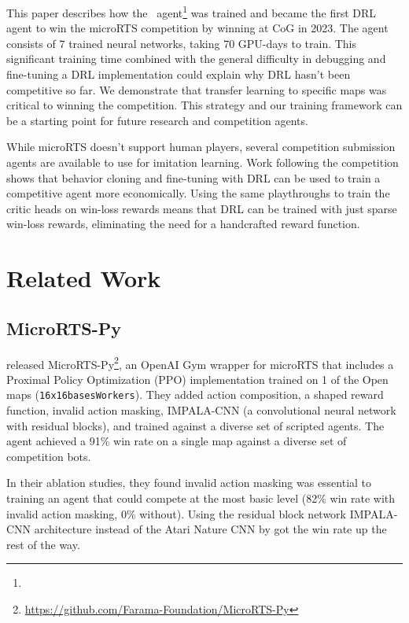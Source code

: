 \documentclass[conference]{IEEEtran}
\begin{document}
This paper describes how the \agentName\ agent\footnote{\raiMicroRTSGitHubUrl} was
trained and became the first DRL agent to win the microRTS competition by winning at CoG
in 2023. The agent consists of 7 trained neural networks, taking 70
GPU-days to train. This significant training time combined with the general difficulty
in debugging and fine-tuning a DRL implementation could explain why DRL hasn't been
competitive so far. We demonstrate that transfer learning to specific maps was
critical to winning the competition. This strategy and our training framework can be a starting
point for future research and competition agents.

While microRTS doesn't support human players, several competition submission agents are
available to use for imitation learning. Work following the
competition shows that behavior cloning and fine-tuning with DRL can be used to train a
competitive agent more economically. Using the same playthroughs to train the critic
heads on win-loss rewards means that DRL can be trained with just sparse win-loss
rewards, eliminating the need for a handcrafted reward function.

\section{Related Work}
\subsection{MicroRTS-Py}
\cite{DBLP:journals/corr/abs-2105-13807} released MicroRTS-Py\footnote{\url{https://github.com/Farama-Foundation/MicroRTS-Py}}, an OpenAI Gym
wrapper for microRTS that includes a Proximal Policy Optimization (PPO) \cite{DBLP:journals/corr/SchulmanWDRK17} implementation
trained on 1 of the Open maps (\texttt{16x16basesWorkers}). They added action composition, a shaped reward function, invalid action
masking, IMPALA-CNN (a convolutional neural network with residual blocks), and trained
against a diverse set of scripted agents. The agent achieved a
91\% win rate on a single map against a diverse set of competition bots.

In their ablation studies, they found invalid action masking was essential to training an agent that could compete at
the most basic level (82\% win rate with invalid action masking, 0\% without). Using the
residual block network IMPALA-CNN architecture instead of the Atari Nature CNN by
\cite{DBLP:journals/corr/MnihKSGAWR13} got the win rate up the rest of the way.
\end{document}
